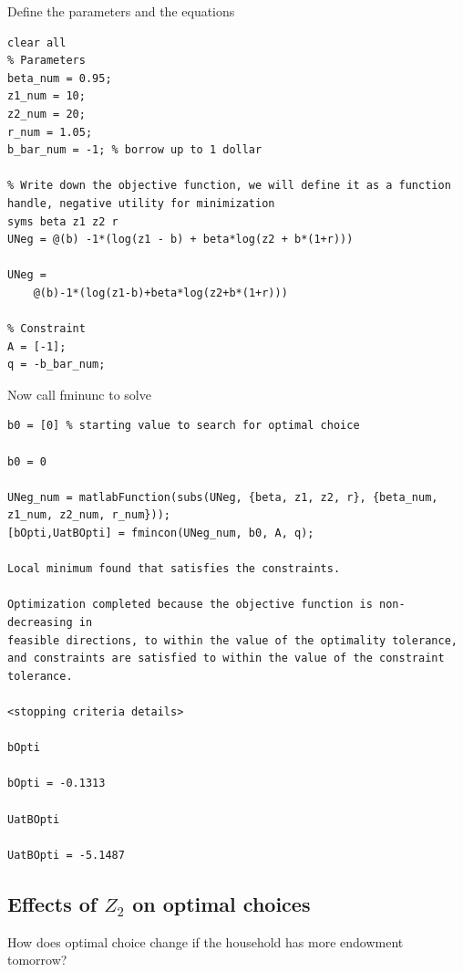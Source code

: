\documentclass[
]{book}
\begin{document}
Define the parameters and the equations

\begin{verbatim}
clear all
% Parameters
beta_num = 0.95;
z1_num = 10;
z2_num = 20;
r_num = 1.05;
b_bar_num = -1; % borrow up to 1 dollar 

% Write down the objective function, we will define it as a function handle, negative utility for minimization
syms beta z1 z2 r
UNeg = @(b) -1*(log(z1 - b) + beta*log(z2 + b*(1+r)))

UNeg = 
    @(b)-1*(log(z1-b)+beta*log(z2+b*(1+r)))

% Constraint
A = [-1];
q = -b_bar_num;
\end{verbatim}

Now call fminunc to solve

\begin{verbatim}
b0 = [0] % starting value to search for optimal choice

b0 = 0

UNeg_num = matlabFunction(subs(UNeg, {beta, z1, z2, r}, {beta_num, z1_num, z2_num, r_num}));
[bOpti,UatBOpti] = fmincon(UNeg_num, b0, A, q);

Local minimum found that satisfies the constraints.

Optimization completed because the objective function is non-decreasing in 
feasible directions, to within the value of the optimality tolerance,
and constraints are satisfied to within the value of the constraint tolerance.

<stopping criteria details>

bOpti

bOpti = -0.1313

UatBOpti

UatBOpti = -5.1487
\end{verbatim}

\hypertarget{effects-of-z_2-on-optimal-choices}{%
\subsection{\texorpdfstring{Effects of \(Z_2\) on optimal choices}{Effects of Z\_2 on optimal choices}}\label{effects-of-z_2-on-optimal-choices}}

How does optimal choice change if the household has more endowment
tomorrow?
\end{document}
